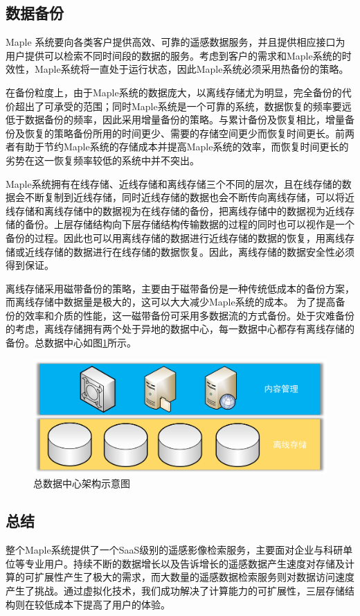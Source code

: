 \documentclass{article}
\begin{document}
\subsection{数据备份}
Maple 系统要向各类客户提供高效、可靠的遥感数据服务，并且提供相应接口为用户提供可以检索不同时间段的数据的服务。考虑到客户的需求和Maple系统的时效性，Maple系统将一直处于运行状态，因此Maple系统必须采用热备份的策略。

在备份粒度上，由于Maple系统的数据庞大，以离线存储尤为明显，完全备份的代价超出了可承受的范围；同时Maple系统是一个可靠的系统，数据恢复的频率要远低于数据备份的频率，因此采用增量备份的策略。与累计备份及恢复相比，增量备份及恢复的策略备份所用的时间更少、需要的存储空间更少而恢复时间更长。前两者有助于节约Maple系统的存储成本并提高Maple系统的效率，而恢复时间更长的劣势在这一恢复频率较低的系统中并不突出。

Maple系统拥有在线存储、近线存储和离线存储三个不同的层次，且在线存储的数据会不断复制到近线存储，同时近线存储的数据也会不断传向离线存储，可以将近线存储和离线存储中的数据视为在线存储的备份，把离线存储中的数据视为近线存储的备份。上层存储结构向下层存储结构传输数据的过程的同时也可以视作是一个备份的过程。因此也可以用离线存储的数据进行近线存储的数据的恢复，用离线存储或近线存储的数据进行在线存储的数据恢复。因此，离线存储的数据安全性必须得到保证。

离线存储采用磁带备份的策略，主要由于磁带备份是一种传统低成本的备份方案，而离线存储中数据量是极大的，这可以大大减少Maple系统的成本。 为了提高备份的效率和介质的性能，这一磁带备份可采用多数据流的方式备份。处于灾难备份的考虑，离线存储拥有两个处于异地的数据中心，每一数据中心都存有离线存储的备份。总数据中心如图\ref{all}所示。

\begin{figure}[H]
\centering 
\includegraphics[width=\textwidth]{all.jpg}
\caption{总数据中心架构示意图}
\label{all}
\end{figure}

\subsection{总结}
整个Maple系统提供了一个SaaS级别的遥感影像检索服务，主要面对企业与科研单位等专业用户。持续不断的数据增长以及告诉增长的遥感数据产生速度对存储及计算的可扩展性产生了极大的需求，而大数量的遥感数据检索服务则对数据访问速度产生了挑战。通过虚拟化技术，我们成功解决了计算能力的可扩展性，三层存储结构则在较低成本下提高了用户的体验。
\end{document}
